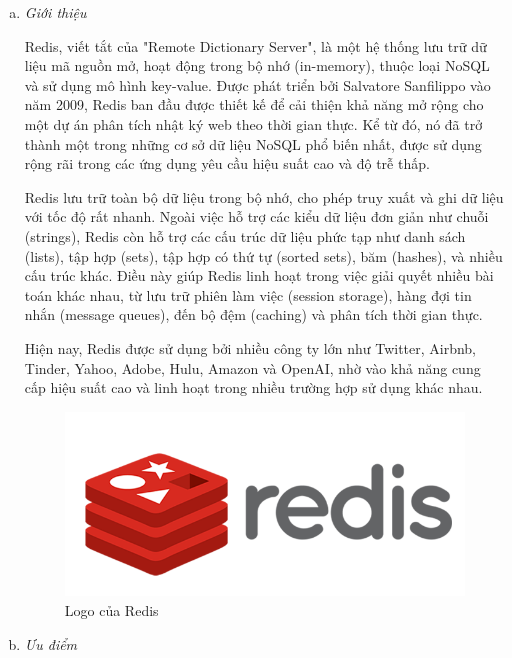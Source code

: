 \begin{enumerate}[(a)]
	\item \textit{Giới thiệu}

	      Redis, viết tắt của "Remote Dictionary Server", là một hệ thống lưu trữ dữ liệu mã nguồn mở, hoạt động trong bộ nhớ (in-memory), thuộc loại NoSQL và sử dụng mô hình key-value. Được phát triển bởi Salvatore Sanfilippo vào năm 2009, Redis ban đầu được thiết kế để cải thiện khả năng mở rộng cho một dự án phân tích nhật ký web theo thời gian thực. Kể từ đó, nó đã trở thành một trong những cơ sở dữ liệu NoSQL phổ biến nhất, được sử dụng rộng rãi trong các ứng dụng yêu cầu hiệu suất cao và độ trễ thấp.

	      Redis lưu trữ toàn bộ dữ liệu trong bộ nhớ, cho phép truy xuất và ghi dữ liệu với tốc độ rất nhanh. Ngoài việc hỗ trợ các kiểu dữ liệu đơn giản như chuỗi (strings), Redis còn hỗ trợ các cấu trúc dữ liệu phức tạp như danh sách (lists), tập hợp (sets), tập hợp có thứ tự (sorted sets), băm (hashes), và nhiều cấu trúc khác. Điều này giúp Redis linh hoạt trong việc giải quyết nhiều bài toán khác nhau, từ lưu trữ phiên làm việc (session storage), hàng đợi tin nhắn (message queues), đến bộ đệm (caching) và phân tích thời gian thực.

	      Hiện nay, Redis được sử dụng bởi nhiều công ty lớn như Twitter, Airbnb, Tinder, Yahoo, Adobe, Hulu, Amazon và OpenAI, nhờ vào khả năng cung cấp hiệu suất cao và linh hoạt trong nhiều trường hợp sử dụng khác nhau.

	      \begin{figure}[H]
		      \centering
		      \includegraphics[width=15cm]{Images/redis.png}
		      \vspace{0.5cm}
		      \caption{Logo của Redis}
		      \label{fig:my_label}
	      \end{figure}

	\item \textit{Ưu điểm} \cite{Redis}


\end{enumerate}

